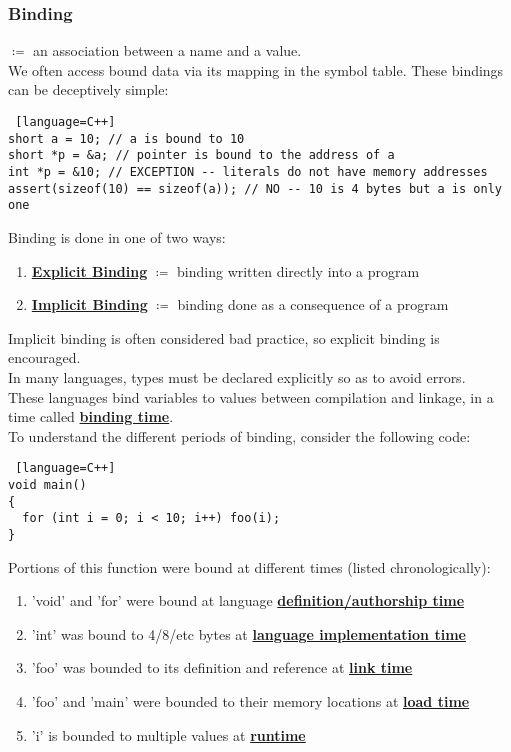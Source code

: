 \documentclass[../../lecture_notes.tex]{subfiles}
\begin{document}
\subsubsection*{Binding}
$\coloneqq$ an association between a name and a value.\\
We often access bound data via its mapping in the symbol table.  These bindings can be deceptively simple:
\begin{lstlisting} [language=C++]
short a = 10; // a is bound to 10
short *p = &a; // pointer is bound to the address of a
int *p = &10; // EXCEPTION -- literals do not have memory addresses
assert(sizeof(10) == sizeof(a)); // NO -- 10 is 4 bytes but a is only one
\end{lstlisting}
Binding is done in one of two ways:
\begin{enumerate} [itemsep=0mm]
	\item \textbf{\underline{Explicit Binding}} $\coloneqq$ binding written directly into a program
	\item \textbf{\underline{Implicit Binding}} $\coloneqq$ binding done as a consequence of a program
\end{enumerate}
Implicit binding is often considered bad practice, so explicit binding is encouraged.\\
In many languages, types must be declared explicitly so as to avoid errors.\\
These languages bind variables to values between compilation and linkage, 
	in a time called \textbf{\underline{binding time}}.\\
To understand the different periods of binding, consider the following code:
\begin{lstlisting} [language=C++]
void main() 
{
  for (int i = 0; i < 10; i++) foo(i);
}
\end{lstlisting}
Portions of this function were bound at different times (listed chronologically):
\begin{enumerate} [itemsep=0mm]
	\item 'void' and 'for' were bound at language \textbf{\underline{definition/authorship time}}
	\item 'int' was bound to 4/8/etc bytes at \textbf{\underline{language implementation time}}
	\item 'foo' was bounded to its definition and reference at \textbf{\underline{link time}}
	\item 'foo' and 'main' were bounded to their memory locations at \textbf{\underline{load time}}
	\item 'i' is bounded to multiple values at \textbf{\underline{runtime}}
\end{enumerate}
\end{document}
